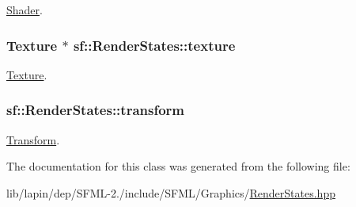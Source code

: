 \hyperlink{classsf_1_1_shader}{Shader}. 

\hypertarget{classsf_1_1_render_states_ad7eb50453917561fa7a9df7f4c53f1fd}{
\subsubsection[{texture}]{ {\bf Texture} $\ast$ sf\-::\-Render\-States\-::texture}}\label{classsf_1_1_render_states_ad7eb50453917561fa7a9df7f4c53f1fd}


\hyperlink{classsf_1_1_texture}{Texture}. 

\hypertarget{classsf_1_1_render_states_a1f737981a0f2f0d4bb8dac866a8d1149}{
\subsubsection[{transform}]{ sf\-::\-Render\-States\-::transform}}\label{classsf_1_1_render_states_a1f737981a0f2f0d4bb8dac866a8d1149}


\hyperlink{classsf_1_1_transform}{Transform}. 



The documentation for this class was generated from the following file\-:\begin{DoxyCompactItemize}
\item 
lib/lapin/dep/\-S\-F\-M\-L-\/2./include/\-S\-F\-M\-L/\-Graphics/\hyperlink{lapin_2dep_2_s_f_m_l-2_83_2include_2_s_f_m_l_2_graphics_2_render_states_8hpp}{Render\-States.\-hpp}\end{DoxyCompactItemize}
